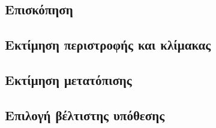 \subsection{Επισκόπηση}
\label{subsection:02_03_03:01}

\subsection{Εκτίμηση περιστροφής και κλίμακας}
\label{subsection:02_03_03:02}

\subsection{Εκτίμηση μετατόπισης}
\label{subsection:02_03_03:03}

\subsection{Επιλογή βέλτιστης υπόθεσης}
\label{subsection:02_03_03:04}
